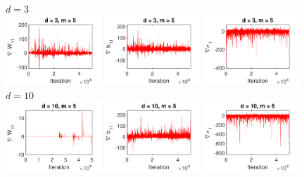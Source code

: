 \documentclass[10pt]{article}
\begin{document}
\begin{figure}[p!]
\centering
$d=3$ \\
\includegraphics[width=0.32\textwidth,trim={0 23 0 11.5},clip]{images/bananaND_usivi_gW11_d3_m5.pdf}
\includegraphics[width=0.32\textwidth,trim={0 23 0 11.5},clip]{images/bananaND_usivi_gb11_d3_m5.pdf}
\includegraphics[width=0.32\textwidth,trim={0 23 0 11.5},clip]{images/bananaND_usivi_gsigma1_d3_m5.pdf}
\\
$d=10$ \\
\includegraphics[width=0.32\textwidth,trim={0 23 0 11.5},clip]{images/bananaND_usivi_gW11_d10_m5.pdf}
\includegraphics[width=0.32\textwidth,trim={0 23 0 11.5},clip]{images/bananaND_usivi_gb11_d10_m5.pdf}
\includegraphics[width=0.32\textwidth,trim={0 23 0 11.5},clip]{images/bananaND_usivi_gsigma1_d10_m5.pdf}

\end{figure}
\end{document}
